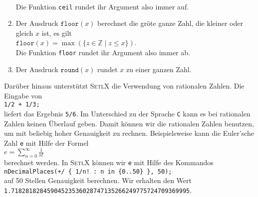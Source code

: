 \begin{enumerate}
      \\[0.2cm]
      Die Funktion \texttt{ceil} rundet ihr Argument also immer auf.
\item Der Ausdruck $\texttt{floor}(x)$ berechnet die gr\"{o}\3te ganze Zahl, die kleiner oder
      gleich $x$ ist, es gilt
      \\[0.2cm]
      \hspace*{1.3cm}
      $\texttt{floor}(x) = \max(\{ z \in \mathbb{Z} \mid z \leq x \})$.
      \\[0.2cm]
      Die Funktion \texttt{floor} rundet ihr Argument also immer ab.
\item Der Ausdruck $\texttt{round}(x)$ rundet $x$ zu einer ganzen Zahl.
\end{enumerate}
Dar\"{u}ber hinaus unterst\"{u}tzt \textsc{SetlX} die Verwendung von rationalen Zahlen.  Die
Eingabe von
\\[0.2cm]
\hspace*{1.3cm}
\texttt{1/2 + 1/3;}
\\[0.2cm]
liefert das Ergebnis \texttt{5/6}.  Im Unterschied zu der Sprache \texttt{C} kann es bei rationalen
Zahlen keinen Überlauf geben.  Damit k\"{o}nnen wir die rationalen Zahlen benutzen, um mit beliebig
hoher Genauigkeit zu rechnen.  Beispielsweise kann die Euler'sche Zahl \texttt{e} mit Hilfe der Formel
\\[0.2cm]
\hspace*{1.3cm}
$\displaystyle e = \sum\limits_{n=0}^\infty \frac{1}{n!}$
\\[0.2cm]
berechnet werden.  In \textsc{SetlX} k\"{o}nnen wir \texttt{e} mit Hilfe des Kommandos
\\[0.2cm]
\hspace*{1.3cm}
\texttt{nDecimalPlaces(+/ \{ 1/n! : n in \{0..50\} \}, 50);}
\\[0.2cm]
auf 50 Stellen Genauigkeit berechnen.  Wir erhalten den Wert
\\[0.2cm]
\hspace*{1.3cm}
\texttt{1.71828182845904523536028747135266249775724709369995}.


